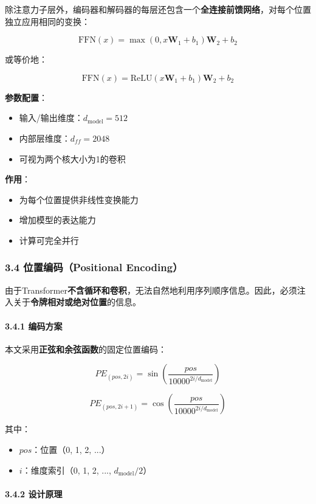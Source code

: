 \documentclass[11pt,a4paper]{article}
\begin{document}
除注意力子层外，编码器和解码器的每层还包含一个\textbf{全连接前馈网络}，对每个位置独立应用相同的变换：

\[
\text{FFN}(x) = \max(0, x\mathbf{W}_1 + b_1)\mathbf{W}_2 + b_2
\]

或等价地：

\[
\text{FFN}(x) = \text{ReLU}(x\mathbf{W}_1 + b_1)\mathbf{W}_2 + b_2
\]

\textbf{参数配置}：
\begin{itemize}
  \item 输入/输出维度：$d_{\text{model}} = 512$
  \item 内部层维度：$d_{ff} = 2048$
  \item 可视为两个核大小为1的卷积
\end{itemize}

\textbf{作用}：
\begin{itemize}
  \item 为每个位置提供非线性变换能力
  \item 增加模型的表达能力
  \item 计算可完全并行
\end{itemize}

\subsubsection*{3.4 位置编码（Positional Encoding）}

由于Transformer\textbf{不含循环和卷积}，无法自然地利用序列顺序信息。因此，必须注入关于\textbf{令牌相对或绝对位置}的信息。

\paragraph{3.4.1 编码方案}

本文采用\textbf{正弦和余弦函数}的固定位置编码：

\[
PE_{(pos, 2i)} = \sin\left(\frac{pos}{10000^{2i/d_{\text{model}}}}\right)
\]

\[
PE_{(pos, 2i+1)} = \cos\left(\frac{pos}{10000^{2i/d_{\text{model}}}}\right)
\]

其中：
\begin{itemize}
  \item $pos$：位置（0, 1, 2, ...）
  \item $i$：维度索引（0, 1, 2, ..., $d_{\text{model}}/2$）
\end{itemize}

\paragraph{3.4.2 设计原理}
\end{document}
